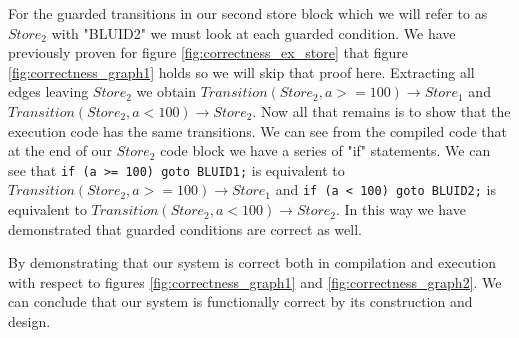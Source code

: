 For the guarded transitions in our second store block which we will refer to as $Store_2$ with "BLUID2" we must look at each guarded condition. We have previously proven for figure \ref{fig:correctness_ex_store} that figure \ref{fig:correctness_graph1} holds so we will skip that proof here. Extracting all edges leaving $Store_2$ we obtain $Transition(Store_2, a >= 100) \rightarrow Store_1$ and $Transition(Store_2, a < 100) \rightarrow Store_2$. Now all that remains is to show that the execution code has the same transitions. We can see from the compiled code that at the end of our $Store_2$ code block we have a series of "if" statements. We can see that \texttt{if (a >= 100) goto BLUID1;} is equivalent to $Transition(Store_2, a >= 100) \rightarrow Store_1$ and \texttt{if (a < 100) goto BLUID2;} is equivalent to $Transition(Store_2, a < 100) \rightarrow Store_2$. In this way we have demonstrated that guarded conditions are correct as well.


By demonstrating that our system is correct both in compilation and execution with respect to figures \ref{fig:correctness_graph1} and \ref{fig:correctness_graph2}. We can conclude that our system is functionally correct by its construction and design.

